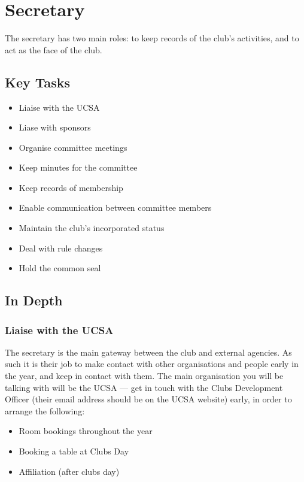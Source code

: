 \section{Secretary}
\label{sec:secretary}

The secretary has two main roles: to keep records of the club's activities, and to act as the face of the club.

\subsection{Key Tasks}
\label{sub:secretary_key_tasks}

\begin{itemize}
  \item Liaise with the UCSA
  \item Liase with sponsors
  \item Organise committee meetings
  \item Keep minutes for the committee
  \item Keep records of membership
  \item Enable communication between committee members
  \item Maintain the club's incorporated status
  \item Deal with rule changes
  \item Hold the common seal
\end{itemize}

\subsection{In Depth}

\subsubsection{Liaise with the UCSA}

The secretary is the main gateway between the club and external agencies. As such it is their job to make contact with other organisations and people early in the year, and keep in contact with them. The main organisation you will be talking with will be the UCSA --- get in touch with the Clubs Development Officer (their email address should be on the UCSA website) early, in order to arrange the following:

\begin{itemize}
  \item Room bookings throughout the year
  \item Booking a table at Clubs Day
  \item Affiliation (after clubs day)
\end{itemize}

